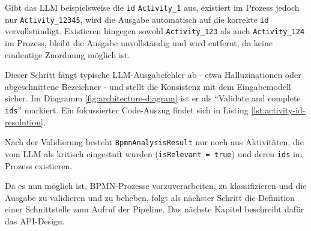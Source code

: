 Gibt das \ac{LLM} beispielsweise die \texttt{id} \texttt{Activity\_1} aus, existiert im Prozess jedoch nur \texttt{Activity\_12345}, wird die Ausgabe automatisch auf die korrekte \texttt{id} vervollständigt. Existieren hingegen sowohl \texttt{Activity\_123} als auch \texttt{Activity\_124} im Prozess, bleibt die Ausgabe unvollständig und wird entfernt, da keine eindeutige Zuordnung möglich ist.

Dieser Schritt fängt typische \ac{LLM}-Ausgabefehler ab - etwa Halluzinationen oder abgeschnittene Bezeichner - und stellt die Konsistenz mit dem Eingabemodell sicher. Im Diagramm \ref{fig:architecture-diagram} ist er als \enquote{Validate and complete \texttt{ids}} markiert. Ein fokussierter Code-Auszug findet sich in Listing \ref{lst:activity-id-resolution}.

Nach der Validierung besteht \texttt{BpmnAnalysisResult} nur noch aus Aktivitäten, die vom \ac{LLM} als kritisch eingestuft wurden (\texttt{isRelevant = true}) und deren \texttt{ids} im Prozess existieren.

Da es nun möglich ist, \ac{BPMN}-Prozesse vorzuverarbeiten, zu klassifizieren und die Ausgabe zu validieren und zu beheben, folgt als nächster Schritt die Definition einer Schnittstelle zum Aufruf der Pipeline. Das nächste Kapitel beschreibt dafür das API-Design.